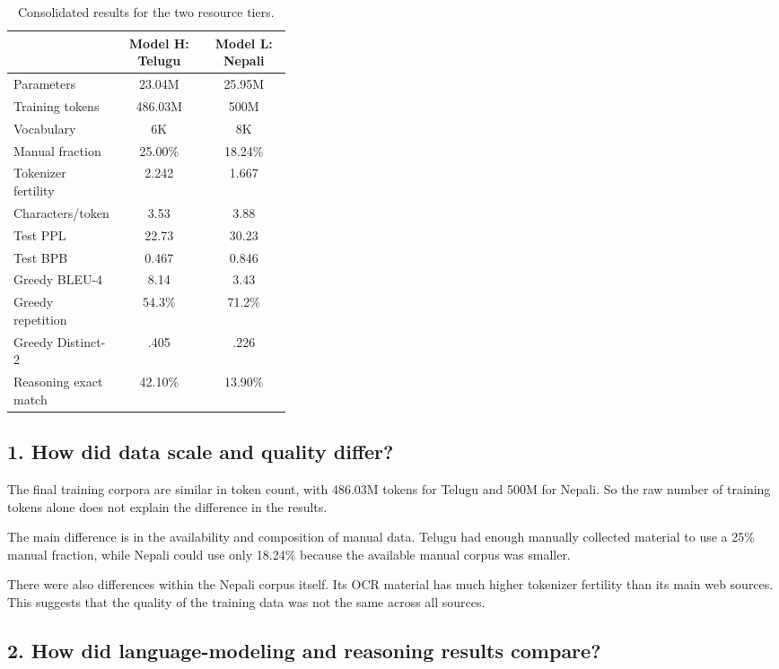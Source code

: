 \documentclass[10pt,a4paper]{article}
\begin{document}
\begin{table}[H]
\centering
\small
\caption{Consolidated results for the two resource tiers.}
\begin{tabular}{p{0.36\linewidth}cc}
\toprule
 & \textbf{Model H: Telugu} & \textbf{Model L: Nepali}\\
\midrule
Parameters & 23.04M & 25.95M\\
Training tokens & 486.03M & 500M\\
Vocabulary & 6K & 8K\\
Manual fraction & 25.00\% & 18.24\%\\
Tokenizer fertility & 2.242 & 1.667\\
Characters/token & 3.53 & 3.88\\
Test PPL & 22.73 & 30.23\\
Test BPB & 0.467 & 0.846\\
Greedy BLEU-4 & 8.14 & 3.43\\
Greedy repetition & 54.3\% & 71.2\%\\
Greedy Distinct-2 & .405 & .226\\
Reasoning exact match & 42.10\% & 13.90\%\\
\bottomrule
\end{tabular}
\end{table}

\subsection{1. How did data scale and quality differ?}

The final training corpora are similar in token count, with 486.03M
tokens for Telugu and 500M for Nepali. So the raw number of training
tokens alone does not explain the difference in the results.

The main difference is in the availability and composition of manual
data. Telugu had enough manually collected material to use a 25\%
manual fraction, while Nepali could use only 18.24\% because the
available manual corpus was smaller.

There were also differences within the Nepali corpus itself. Its OCR
material has much higher tokenizer fertility than its main web
sources. This suggests that the quality of the training data was not
the same across all sources.

\subsection{2. How did language-modeling and reasoning results compare?}
\end{document}
